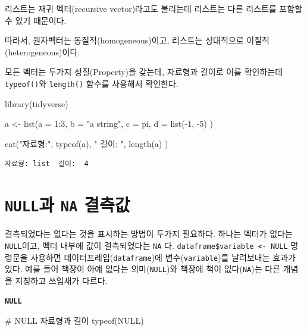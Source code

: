 \documentclass[
  letterpaper,
  chapter,a4paper,showtrims,openright,hidelinks]{oblivoir}
\newenvironment{Shaded}{\begin{snugshade}}{\end{snugshade}}
\newcommand{\AttributeTok}[1]{\textcolor[rgb]{0.40,0.45,0.13}{#1}}
\newcommand{\CommentTok}[1]{\textcolor[rgb]{0.37,0.37,0.37}{#1}}
\newcommand{\ConstantTok}[1]{\textcolor[rgb]{0.56,0.35,0.01}{#1}}
\newcommand{\DecValTok}[1]{\textcolor[rgb]{0.68,0.00,0.00}{#1}}
\newcommand{\FunctionTok}[1]{\textcolor[rgb]{0.28,0.35,0.67}{#1}}
\newcommand{\NormalTok}[1]{\textcolor[rgb]{0.00,0.23,0.31}{#1}}
\newcommand{\OtherTok}[1]{\textcolor[rgb]{0.00,0.23,0.31}{#1}}
\newcommand{\SpecialCharTok}[1]{\textcolor[rgb]{0.37,0.37,0.37}{#1}}
\newcommand{\StringTok}[1]{\textcolor[rgb]{0.13,0.47,0.30}{#1}}
\begin{document}
리스트는 재귀 벡터(recursive vector)라고도 불리는데 리스트는 다른
리스트를 포함할 수 있기 때문이다.

따라서, 원자벡터는 동질적(homogeneous)이고, 리스트는 상대적으로
이질적(heterogeneous)이다.

모든 벡터는 두가지 성질(Property)을 갖는데, 자료형과 길이로 이를
확인하는데 \texttt{typeof()}와 \texttt{length()} 함수를 사용해서
확인한다.

\begin{Shaded}
\begin{Highlighting}[]
\FunctionTok{library}\NormalTok{(tidyverse)}

\NormalTok{a }\OtherTok{\textless{}{-}} \FunctionTok{list}\NormalTok{(}\AttributeTok{a =} \DecValTok{1}\SpecialCharTok{:}\DecValTok{3}\NormalTok{,}
            \AttributeTok{b =} \StringTok{"a string"}\NormalTok{,}
            \AttributeTok{c =}\NormalTok{ pi,}
            \AttributeTok{d =} \FunctionTok{list}\NormalTok{(}\SpecialCharTok{{-}}\DecValTok{1}\NormalTok{, }\SpecialCharTok{{-}}\DecValTok{5}\NormalTok{) )}
  
\FunctionTok{cat}\NormalTok{(}\StringTok{"자료형:"}\NormalTok{, }\FunctionTok{typeof}\NormalTok{(a), }\StringTok{" 길이: "}\NormalTok{, }\FunctionTok{length}\NormalTok{(a) ) }
\end{Highlighting}
\end{Shaded}

\begin{verbatim}
자료형: list  길이:  4
\end{verbatim}

\hypertarget{is-na-null}{%
\section{\texorpdfstring{\texttt{NULL}과 \texttt{NA}
결측값}{NULL과 NA 결측값}}\label{is-na-null}}

결측되었다는 없다는 것을 표시하는 방법이 두가지 필요하다. 하나는 벡터가
없다는 \texttt{NULL}이고, 벡터 내부에 값이 결측되었다는 \texttt{NA} 다.
\texttt{dataframe\$variable\ \textless{}-\ NULL} 명령문을 사용하면
데이터프레임(\texttt{dataframe})에 변수(\texttt{variable})를 날려보내는
효과가 있다. 예를 들어 책장이 아예 없다는 의미(\texttt{NULL})와 책장에
책이 없다(\texttt{NA})는 다른 개념을 지칭하고 쓰임새가 다르다.

\textbf{\texttt{NULL}}

\begin{Shaded}
\begin{Highlighting}[]
\CommentTok{\# NULL 자료형과 길이}
\FunctionTok{typeof}\NormalTok{(}\ConstantTok{NULL}\NormalTok{)}
\end{Highlighting}
\end{Shaded}
\end{document}
